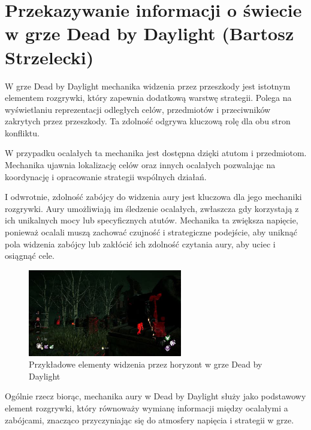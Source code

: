 \section{Przekazywanie informacji o świecie w grze Dead by Daylight (Bartosz Strzelecki)}\label{chap:dbd}

W grze Dead by Daylight mechanika widzenia przez przeszkody jest istotnym elementem rozgrywki, który
zapewnia dodatkową warstwę strategii. Polega na wyświetlaniu reprezentacji odległych celów, przedmiotów i przeciwników
zakrytych przez przeszkody. Ta zdolność odgrywa kluczową rolę dla obu stron konfliktu.

W przypadku ocalałych ta mechanika jest dostępna dzięki atutom i przedmiotom. Mechanika ujawnia lokalizację celów oraz
innych ocalałych pozwalając na koordynację i opracowanie strategii wspólnych działań.

I odwrotnie, zdolność zabójcy do widzenia aury jest kluczowa dla jego mechaniki rozgrywki.
Aury umożliwiają im śledzenie ocalałych, zwłaszcza gdy korzystają z ich unikalnych mocy lub specyficznych atutów. 
Mechanika ta zwiększa napięcie, ponieważ ocalali muszą zachować czujność i strategiczne podejście, 
aby uniknąć pola widzenia zabójcy lub zakłócić ich zdolność czytania aury, aby uciec i osiągnąć cele.

\begin{figure}[h]
\centering
\includegraphics[width=0.6\textwidth]{images/aura}
\caption{Przykładowe elementy widzenia przez horyzont w grze Dead by Daylight}
\end{figure}

Ogólnie rzecz biorąc, mechanika aury w Dead by Daylight służy jako podstawowy element rozgrywki,
który równoważy wymianę informacji między ocalałymi a zabójcami, znacząco przyczyniając się do atmosfery napięcia i strategii w grze.

